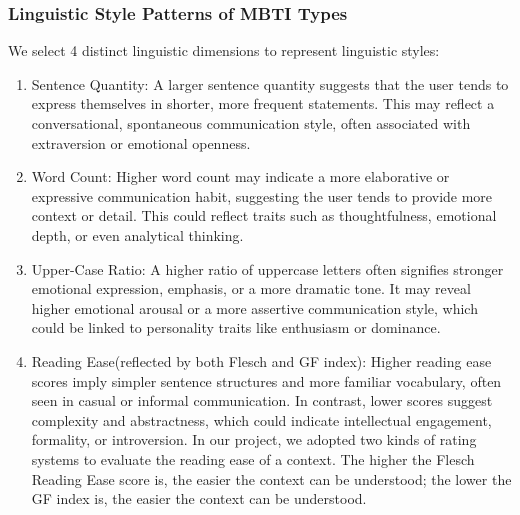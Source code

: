 \documentclass[12pt]{article}
\numberwithin{figure}{section}  %
\begin{document}
	\subsubsection{Linguistic Style Patterns of MBTI Types}
	We select 4 distinct linguistic dimensions to represent linguistic styles:
	\begin{enumerate}
		\item Sentence Quantity: A larger sentence quantity suggests that the
		user tends to express themselves in shorter, more frequent statements.
		This may reflect a conversational, spontaneous communication style,
		often associated with extraversion or emotional openness.  
		\item Word Count: Higher word count may indicate a more elaborative or
		expressive communication habit, suggesting the user tends to provide
		more context or detail. This could reflect traits such as
		thoughtfulness, emotional depth, or even analytical thinking.
		\item Upper-Case Ratio: A higher ratio of uppercase letters often
		signifies stronger emotional expression, emphasis, or a more dramatic
		tone. It may reveal higher emotional arousal or a more assertive
		communication style, which could be linked to personality traits like
		enthusiasm or dominance. %
		\item Reading Ease(reflected by both Flesch and GF index): Higher reading
		ease scores imply simpler sentence structures and more familiar
		vocabulary, often seen in casual or informal communication. In contrast,
		lower scores suggest complexity and abstractness, which could indicate
		intellectual engagement, formality, or introversion. In our project, we
		adopted two kinds of rating systems to evaluate the reading ease of a
		context. The higher the Flesch Reading Ease score is, the easier the
		context can be understood; the lower the GF index is, the easier the
		context can be understood.
	\end{enumerate}
	
\end{document}
